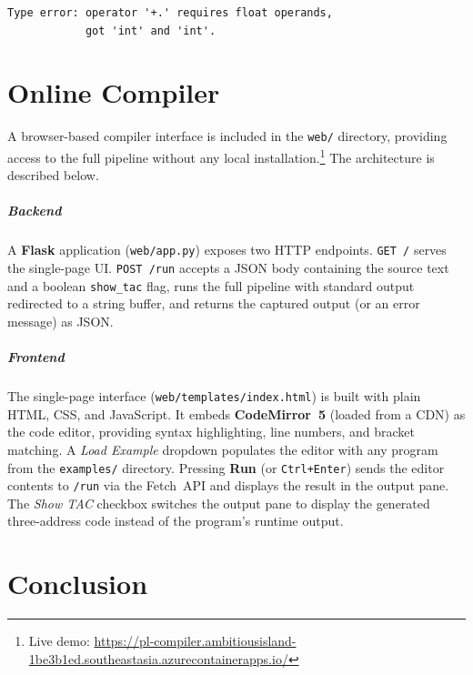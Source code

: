 \documentclass[12pt,a4paper]{report}
\begin{document}
\begin{lstlisting}[style=errorstyle]
Type error: operator '+.' requires float operands,
            got 'int' and 'int'.
\end{lstlisting}

\chapter{Online Compiler}

A browser-based compiler interface is included in the \texttt{web/} directory,
providing access to the full pipeline without any local installation.\footnote{Live demo: \url{https://pl-compiler.ambitiousisland-1be3b1ed.southeastasia.azurecontainerapps.io/}} The
architecture is described below.

\paragraph{Backend}
A \textbf{Flask} application (\texttt{web/app.py}) exposes two HTTP
endpoints. \texttt{GET /} serves the single-page UI.
\texttt{POST /run} accepts a JSON body containing the source text and a
boolean \texttt{show\_tac} flag, runs the full pipeline with standard output
redirected to a string buffer, and returns the captured output (or an error
message) as JSON.

\paragraph{Frontend}
The single-page interface (\texttt{web/templates/index.html}) is built with
plain HTML, CSS, and JavaScript. It embeds \textbf{CodeMirror~5} (loaded from
a CDN) as the code editor, providing syntax highlighting, line numbers, and
bracket matching. A \emph{Load Example} dropdown populates the editor with any
program from the \texttt{examples/} directory. Pressing \textbf{Run} (or
\texttt{Ctrl+Enter}) sends the editor contents to \texttt{/run} via the
Fetch~API and displays the result in the output pane. The \emph{Show TAC}
checkbox switches the output pane to display the generated three-address code
instead of the program's runtime output.

\chapter{Conclusion}
\end{document}
